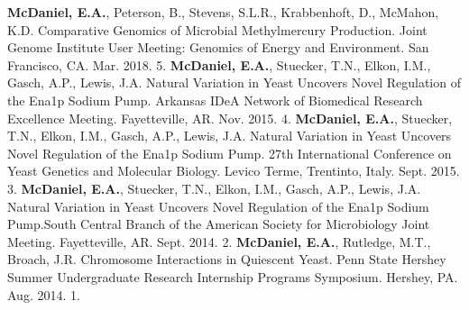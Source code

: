 


\begin{cvpubs}
    \cvpub
        {\textbf{McDaniel, E.A.}, Peterson, B., Stevens, S.L.R., Krabbenhoft, D., McMahon, K.D. Comparative Genomics of Microbial Methylmercury Production. Joint Genome Institute User Meeting: Genomics of Energy and Environment. San Francisco, CA. Mar. 2018.} %
        {5.} %
    \cvpub
        {\textbf{McDaniel, E.A.}, Stuecker, T.N., Elkon, I.M., Gasch, A.P., Lewis, J.A. Natural Variation in Yeast Uncovers Novel Regulation of the Ena1p Sodium Pump. Arkansas IDeA Network of Biomedical Research Excellence Meeting. Fayetteville, AR. Nov. 2015.}       
        {4.}
    \cvpub
        {\textbf{McDaniel, E.A.}, Stuecker, T.N., Elkon, I.M., Gasch, A.P., Lewis, J.A. Natural Variation in Yeast Uncovers Novel Regulation of the Ena1p Sodium Pump. 27th International Conference on Yeast Genetics and Molecular Biology. Levico Terme, Trentinto, Italy. Sept. 2015.}
        {3.}
    \cvpub
        {\textbf{McDaniel, E.A.}, Stuecker, T.N., Elkon, I.M., Gasch, A.P., Lewis, J.A. Natural Variation in Yeast Uncovers Novel Regulation of the Ena1p Sodium Pump.South Central Branch of the American Society for Microbiology Joint Meeting. Fayetteville, AR. Sept. 2014.}
        {2.}
    \cvpub
        {\textbf{McDaniel, E.A.}, Rutledge, M.T., Broach, J.R. Chromosome Interactions in Quiescent Yeast. Penn State Hershey Summer Undergraduate Research Internship Programs Symposium. Hershey, PA. Aug. 2014.}
        {1.}
\end{cvpubs}
